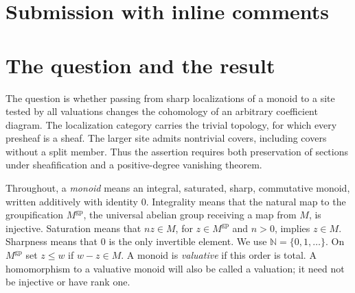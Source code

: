 \documentclass[11pt]{article}
\theoremstyle{definition}
\theoremstyle{remark}
\newcommand{\N}{\mathbb N}
\newcommand{\gp}{\mathrm{gp}}
\begin{document}
\newpage
\section{Submission with inline comments}


\begin{abstract}
Let $P$ be an integral, saturated, sharp commutative monoid. We compare the birhizomic site of monoids under $P$ with the category of sharp localizations $P[-x]^\sharp$, equipped with the trivial topology. For every abelian presheaf $F$ on the latter category, we prove that the canonical morphism $F\to R\pi_*\pi^{-1}F$ is a quasi-isomorphism. In fact, the left Kan extension defining $\pi^{-1}F$ is already a sheaf and has vanishing positive-degree cohomology on every object. The proof refines arbitrary covers by finitely many inequality charts, reduces their relevant intersections to finitely generated monoids, and identifies the coefficient complexes with relative simplicial cochains. A separate descent argument passes from these finite complexes to derived cohomology. No finiteness or rank assumption on $P$, and no restriction on the abelian coefficient diagram, is required.
\end{abstract}

\section{The question and the result}

The question is whether passing from sharp localizations of a monoid to a site tested by all valuations changes the cohomology of an arbitrary coefficient diagram. The localization category carries the trivial topology, for which every presheaf is a sheaf. The larger site admits nontrivial covers, including covers without a split member. Thus the assertion requires both preservation of sections under sheafification and a positive-degree vanishing theorem.

Throughout, a \emph{monoid} means an integral, saturated, sharp, commutative monoid, written additively with identity $0$. Integrality means that the natural map to the groupification $M^{\gp}$, the universal abelian group receiving a map from $M$, is injective. Saturation means that $nz\in M$, for $z\in M^{\gp}$ and $n>0$, implies $z\in M$. Sharpness means that $0$ is the only invertible element. We use $\N=\{0,1,\ldots\}$. On $M^{\gp}$ set $z\leq w$ if $w-z\in M$. A monoid is \emph{valuative} if this order is total. A homomorphism to a valuative monoid will also be called a valuation; it need not be injective or have rank one.
\end{document}
